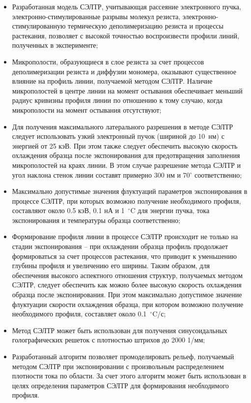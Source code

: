 \begin{itemize}
	\item Разработанная модель СЭЛТР, учитывающая рассеяние электронного пучка, электронно-стимулированные разрывы молекул резиста, электронно-стимулированную термическую деполимеризацию резиста и процессы растекания, позволяет с высокой точностью воспроизвести профили линий, полученных в эксперименте;
	\item Микрополости, образующиеся в слое резиста за счет процессов деполимеризации резиста и диффузии мономера, оказывают существенное влияние на профиль линии, получаемой методом СЭЛТР. Наличие микрополостей в центре линии на момент остывания обеспечивает меньший радиус кривизны профиля линии по отношению к тому случаю, когда микрополости на момент остывания отсутствуют;
	\item Для получения максимального латерального разрешения в методе СЭЛТР следует использовать узкий электронный пучок (шириной до 10~нм) с энергией от 25 кэВ. При этом также следует обеспечить высокую скорость охлаждения образца после экспонирования для предотвращения заполнения микрополостей на краях линии. В этом случае разрешение метода СЭЛТР и угол наклона стенок линии составят примерно 300 нм и 70$^\circ$ соответственно;
	\item Максимально допустимые значения флуктуаций параметров экспонирования в процессе СЭЛТР, при которых возможно получение необходимого профиля, составляют около 0.5 кэВ, 0.1 нА и 1~$^\circ$C для энергии пучка, тока экспонирования и температуры образца соответственно;
	\item Формирование профиля линии в процессе СЭЛТР происходит не только на стадии экспонирования -- при охлаждении образца профиль продолжает формироваться за счет процессов растекания, что приводит к уменьшению глубины профиля и увеличению его ширины.
	Таким образом, для обеспечения высокого аспектного отношения структур, получаемых методом СЭЛТР, следует обеспечить как можно более высокую скорость охлаждения образца после экспонирования. При этом максимально допустимое значение флуктуации скорости охлаждения образца, при котором возможно получение необходимого профиля, составляет около 0.1~$^\circ$C/с;
	\item Метод СЭЛТР может быть использован для получения синусоидальных голографических решеток с плотностью штрихов до 2000 1/мм;
	\item Разработанный алгоритм позволяет промоделировать рельеф, получаемый методом СЭЛТР при экспонировании с произвольным распределением плотности тока по области. За счет этого алгоритм может быть использован в целях определения параметров СЭЛТР для формирования необходимого профиля.
\end{itemize}
